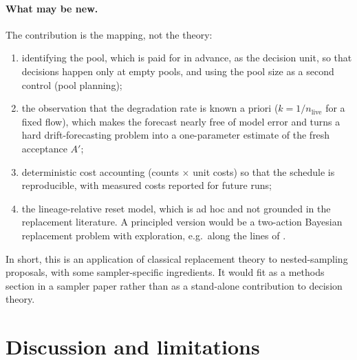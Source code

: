 \documentclass[11pt,a4paper]{article}
\newcommand{\nlive}{n_{\mathrm{live}}}
\begin{document}
\paragraph{What may be new.} The contribution is the mapping, not the theory:
\begin{enumerate}
  \item identifying the pool, which is paid for in advance, as the
        decision unit, so that decisions happen only at empty pools, and
        using the pool size as a second control (pool planning);
  \item the observation that the degradation rate is known a priori
        ($k=1/\nlive$ for a fixed flow), which makes the forecast nearly
        free of model error and turns a hard drift-forecasting problem
        into a one-parameter estimate of the fresh acceptance $A'$;
  \item deterministic cost accounting (counts $\times$ unit costs) so that
        the schedule is reproducible, with measured costs reported for
        future runs;
  \item the lineage-relative reset model, which is ad hoc and not grounded
        in the replacement literature. A principled version would be a
        two-action Bayesian replacement problem with exploration, e.g.\ along
        the lines of \citet{DayanikGurler2002}.
\end{enumerate}
In short, this is an application of classical replacement theory to
nested-sampling proposals, with some sampler-specific ingredients. It would
fit as a methods section in a sampler paper rather than as a stand-alone
contribution to decision theory.

\section{Discussion and limitations}
\end{document}
